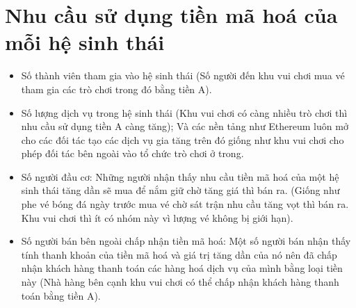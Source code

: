 \section{Nhu cầu sử dụng tiền mã hoá của mỗi hệ sinh thái}
\begin{itemize}
    \item Số thành viên tham gia vào hệ sinh thái (Số người đến khu vui chơi mua vé tham gia các trò chơi trong đó bằng tiền A).
    \item Số lượng dịch vụ trong hệ sinh thái (Khu vui chơi có càng nhiều trò chơi thì nhu cầu sử dụng tiền A càng tăng); Và các nền tảng như Ethereum luôn mở cho các đối tác tạo các dịch vụ gia tăng trên đó giống như khu vui chơi cho phép đối tác bên ngoài vào tổ chức trò chơi ở trong.
    \item  Số người đầu cơ: Những người nhận thấy nhu cầu tiền mã hoá của một hệ sinh thái tăng dần sẽ mua để nắm giữ chờ tăng giá thì bán ra. (Giống như phe vé bóng đá ngày trước mua vé chờ sát trận nhu cầu tăng vọt thì bán ra. Khu vui chơi thì ít có nhóm này vì lượng vé không bị giới hạn).
    \item  Số người bán bên ngoài chấp nhận tiền mã hoá: Một số người bán nhận thấy tính thanh khoản của tiền mã hoá và giá trị tăng dần của nó nên đã chấp nhận khách hàng thanh toán các hàng hoá dịch vụ của mình bằng loại tiền này (Nhà hàng bên cạnh khu vui chơi có thể chấp nhận khách hàng thanh toán bằng tiền A).
\end{itemize}